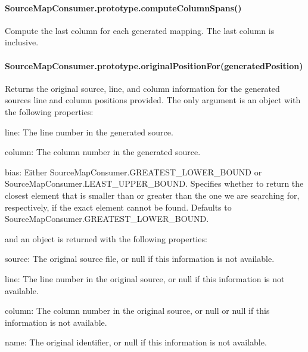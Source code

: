\paragraph*{Source\+Map\+Consumer.\+prototype.\+compute\+Column\+Spans()}

Compute the last column for each generated mapping. The last column is inclusive.

\paragraph*{Source\+Map\+Consumer.\+prototype.\+original\+Position\+For(generated\+Position)}

Returns the original source, line, and column information for the generated source\textquotesingle{}s line and column positions provided. The only argument is an object with the following properties\+:


\begin{DoxyItemize}
\item {\ttfamily line}\+: The line number in the generated source.
\item {\ttfamily column}\+: The column number in the generated source.
\item {\ttfamily bias}\+: Either {\ttfamily Source\+Map\+Consumer.\+G\+R\+E\+A\+T\+E\+S\+T\+\_\+\+L\+O\+W\+E\+R\+\_\+\+B\+O\+U\+N\+D} or {\ttfamily Source\+Map\+Consumer.\+L\+E\+A\+S\+T\+\_\+\+U\+P\+P\+E\+R\+\_\+\+B\+O\+U\+N\+D}. Specifies whether to return the closest element that is smaller than or greater than the one we are searching for, respectively, if the exact element cannot be found. Defaults to {\ttfamily Source\+Map\+Consumer.\+G\+R\+E\+A\+T\+E\+S\+T\+\_\+\+L\+O\+W\+E\+R\+\_\+\+B\+O\+U\+N\+D}.
\end{DoxyItemize}

and an object is returned with the following properties\+:


\begin{DoxyItemize}
\item {\ttfamily source}\+: The original source file, or null if this information is not available.
\item {\ttfamily line}\+: The line number in the original source, or null if this information is not available.
\item {\ttfamily column}\+: The column number in the original source, or null or null if this information is not available.
\item {\ttfamily name}\+: The original identifier, or null if this information is not available.
\end{DoxyItemize}

